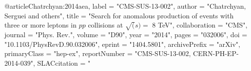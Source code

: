 @article{Chatrchyan:2014aea,
      label          = "CMS-SUS-13-002",
      author         = "Chatrchyan, Serguei and others",
      title          = "{Search for anomalous production of events with three or
                        more leptons in $pp$ collisions at $\sqrt(s) =$ 8 TeV}",
      collaboration  = "CMS",
      journal        = "Phys. Rev.",
      volume         = "D90",
      year           = "2014",
      pages          = "032006",
      doi            = "10.1103/PhysRevD.90.032006",
      eprint         = "1404.5801",
      archivePrefix  = "arXiv",
      primaryClass   = "hep-ex",
      reportNumber   = "CMS-SUS-13-002, CERN-PH-EP-2014-039",
      SLACcitation   = "%
}

